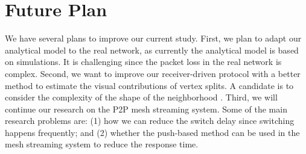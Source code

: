 \documentclass{sig-alt-release2}
\begin{document}
\section{Future Plan}
\label{c:conclude}
    We have several plans to improve our current study.
    First, we plan to adapt our analytical model to the real network,
    as currently the analytical
    model is based on simulations. It is challenging since the packet loss in the real
    network is complex. 
    Second, we want to improve our receiver-driven protocol with
    a better method to estimate the visual contributions of vertex splits. A candidate 
    is to consider the complexity of the shape of the neighborhood \cite{estimating:chen}.
    Third, we will continue our research on the P2P mesh streaming system. 
    Some of the main research problems are:
    (1) how we can reduce the switch delay since switching happens frequently;
    and (2) whether the push-based method can be used in the mesh streaming
    system to reduce the response time.  
\end{document}
